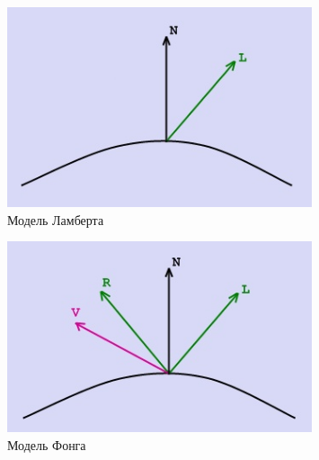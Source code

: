 \begin{figure}[H]
    \centering
    \includegraphics[width=0.8\textwidth]{src/img/lambert.jpg}
    \caption{Модель Ламберта}
    \label{fig:lambert}
\end{figure}

\begin{figure}[H]
    \centering
    \includegraphics[width=0.8\textwidth]{src/img/fong.jpg}
    \caption{Модель Фонга}
    \label{fig:fong}
\end{figure}